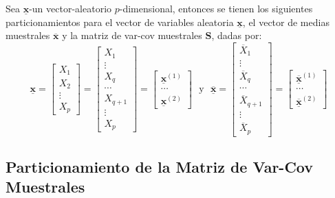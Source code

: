\documentclass[
]{book}
\theoremstyle{definition}
\theoremstyle{definition}
\theoremstyle{definition}
\theoremstyle{definition}
\theoremstyle{remark}
\begin{document}
Sea \(\underline{\mathbf{x}}\)-un vector-aleatorio \(p\)-dimensional, entonces se tienen los siguientes particionamientos para el vector de variables aleatoria \(\underline{\mathbf{x}}\), el vector de medias muestrales \(\overline{\mathbf{x}}\) y la matriz de var-cov muestrales \(\mathbf{S}\), dadas por:
\[
\underline{\mathbf{x}}=\begin{bmatrix}
X_1 \\ X_2 \\  \vdots  \\ X_p
\end{bmatrix}=\begin{bmatrix}
X_1 \\ \vdots \\ X_q \\ \cdots \\ X_{q+1} \\ \vdots  \\ X_p
\end{bmatrix} =\begin{bmatrix}
\underline{\mathbf{x}}^{(1)} \\ \cdots \\ \underline{\mathbf{x}}^{(2)}
\end{bmatrix} \ \ \ \text{y} \ \ \
\underline{\overline{\mathbf{x}}}=\begin{bmatrix}
\overline{X}_1 \\ \vdots \\ \overline{X}_q \\ \cdots \\ \overline{X}_{q+1} \\ \vdots  \\ \overline{X}_p
\end{bmatrix} =\begin{bmatrix}
\underline{\overline{\mathbf{x}}}^{(1)} \\ \cdots \\ \underline{\overline{\mathbf{x}}}^{(2)}
\end{bmatrix}
\]

\hypertarget{particionamiento-de-la-matriz-de-var-cov-muestrales}{%
\subsection{Particionamiento de la Matriz de Var-Cov Muestrales}\label{particionamiento-de-la-matriz-de-var-cov-muestrales}}
\end{document}
